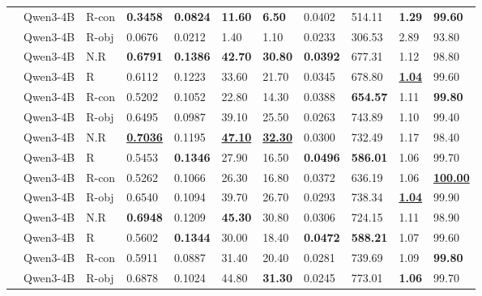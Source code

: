 \begin{table}[t]
\begin{tabular*}{\textwidth}{@{\extracolsep{\fill}}lllllllllll@{}}
			& Qwen3-4B & R-con & \textbf{0.3458} & \textbf{0.0824} & \textbf{11.60} & \textbf{6.50} & 0.0402 & 514.11 & \textbf{1.29} & \textbf{99.60} \\
			& Qwen3-4B & R-obj & 0.0676 & 0.0212 & 1.40 & 1.10 & 0.0233 & 306.53 & 2.89 & 93.80 \\
			\midrule
			 & Qwen3-4B & N.R & \textbf{0.6791} & \textbf{0.1386} & \textbf{42.70} & \textbf{30.80} & \textbf{0.0392} & 677.31 & 1.12 & 98.80 \\
			& Qwen3-4B & R & 0.6112 & 0.1223 & 33.60 & 21.70 & 0.0345 & 678.80 & \underline{\textbf{1.04}} & 99.60 \\
			& Qwen3-4B & R-con & 0.5202 & 0.1052 & 22.80 & 14.30 & 0.0388 & \textbf{654.57} & 1.11 & \textbf{99.80} \\
			& Qwen3-4B & R-obj & 0.6495 & 0.0987 & 39.10 & 25.50 & 0.0263 & 743.89 & 1.10 & 99.40 \\
			\midrule
			 & Qwen3-4B & N.R & \underline{\textbf{0.7036}} & 0.1195 & \underline{\textbf{47.10}} & \underline{\textbf{32.30}} & 0.0300 & 732.49 & 1.17 & 98.40 \\
			& Qwen3-4B & R & 0.5453 & \textbf{0.1346} & 27.90 & 16.50 & \textbf{0.0496} & \textbf{586.01} & 1.06 & 99.70 \\
			& Qwen3-4B & R-con & 0.5262 & 0.1066 & 26.30 & 16.80 & 0.0372 & 636.19 & 1.06 & \underline{\textbf{100.00}} \\
			& Qwen3-4B & R-obj & 0.6540 & 0.1094 & 39.70 & 26.70 & 0.0293 & 738.34 & \underline{\textbf{1.04}} & 99.90 \\
			\midrule
			 & Qwen3-4B & N.R & \textbf{0.6948} & 0.1209 & \textbf{45.30} & 30.80 & 0.0306 & 724.15 & 1.11 & 98.90 \\
			& Qwen3-4B & R & 0.5602 & \textbf{0.1344} & 30.00 & 18.40 & \textbf{0.0472} & \textbf{588.21} & 1.07 & 99.60 \\
			& Qwen3-4B & R-con & 0.5911 & 0.0887 & 31.40 & 20.40 & 0.0281 & 739.69 & 1.09 & \textbf{99.80} \\
			& Qwen3-4B & R-obj & 0.6878 & 0.1024 & 44.80 & \textbf{31.30} & 0.0245 & 773.01 & \textbf{1.06} & 99.70 \\
			\bottomrule
			
		\end{tabular*}
		~\vspace{-12pt}
\end{table}




















